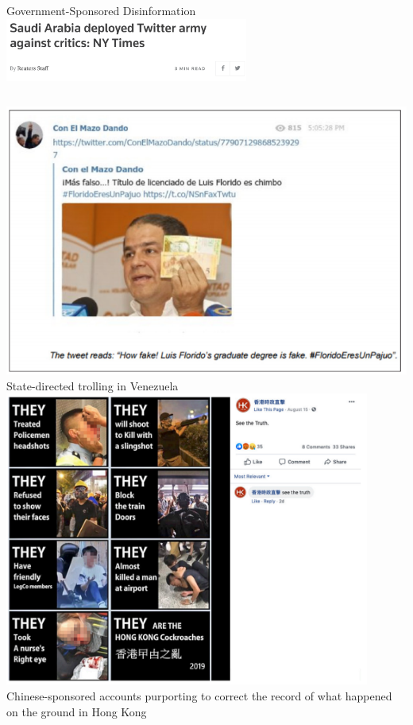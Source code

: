 \documentclass[nobackground,dvipsnames,table,aspectratio=169]{beamer}
\begin{document}
\begin{frame}{Government-Sponsored Disinformation}
    \centering
    \includegraphics[width=0.6\textwidth]{govt-sponsored-disinfo-1}
    \begin{columns}
            \includegraphics[width=\textwidth]{govt-sponsored-disinfo-2}
            \tiny
            State-directed trolling in Venezuela
            \includegraphics[width=0.9\textwidth]{govt-sponsored-disinfo-3}
            \tiny
            Chinese-sponsored accounts purporting to correct the record of what happened on the ground in Hong Kong
    \end{columns}
\end{frame}
\end{document}
